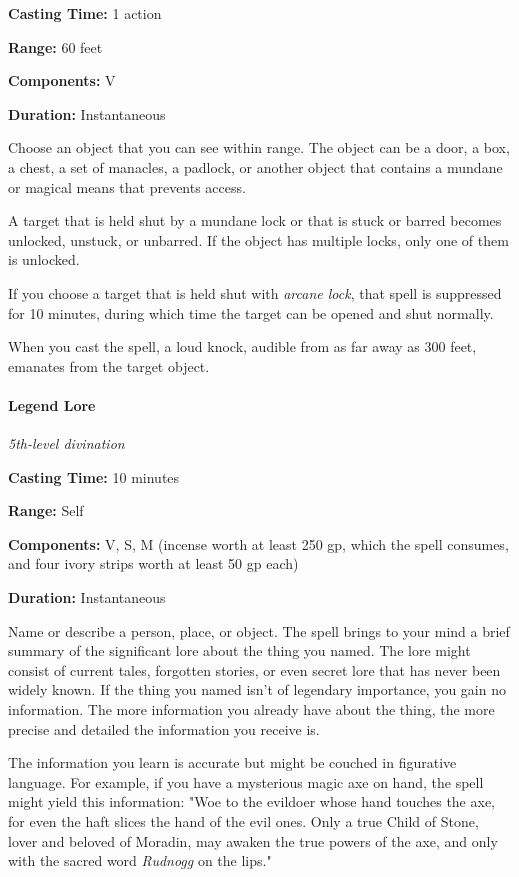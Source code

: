 \documentclass[
]{article}
\begin{document}
\textbf{Casting Time:} 1 action

\textbf{Range:} 60 feet

\textbf{Components:} V

\textbf{Duration:} Instantaneous

Choose an object that you can see within range. The object can be a
door, a box, a chest, a set of manacles, a padlock, or another object
that contains a mundane or magical means that prevents access.

A target that is held shut by a mundane lock or that is stuck or barred
becomes unlocked, unstuck, or unbarred. If the object has multiple
locks, only one of them is unlocked.

If you choose a target that is held shut with \emph{arcane lock}, that
spell is suppressed for 10 minutes, during which time the target can be
opened and shut normally.

When you cast the spell, a loud knock, audible from as far away as 300
feet, emanates from the target object.

\hypertarget{legend-lore}{%
\paragraph{Legend Lore}\label{legend-lore}}

\emph{5th-level divination}

\textbf{Casting Time:} 10 minutes

\textbf{Range:} Self

\textbf{Components:} V, S, M (incense worth at least 250 gp, which the
spell consumes, and four ivory strips worth at least 50 gp each)

\textbf{Duration:} Instantaneous

Name or describe a person, place, or object. The spell brings to your
mind a brief summary of the significant lore about the thing you named.
The lore might consist of current tales, forgotten stories, or even
secret lore that has never been widely known. If the thing you named
isn't of legendary importance, you gain no information. The more
information you already have about the thing, the more precise and
detailed the information you receive is.

The information you learn is accurate but might be couched in figurative
language. For example, if you have a mysterious magic axe on hand, the
spell might yield this information: "Woe to the evildoer whose hand
touches the axe, for even the haft slices the hand of the evil ones.
Only a true Child of Stone, lover and beloved of Moradin, may awaken the
true powers of the axe, and only with the sacred word \emph{Rudnogg} on
the lips."
\end{document}
